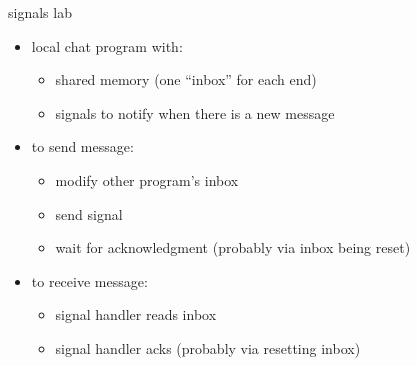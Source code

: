 \begin{frame}{signals lab}
    \begin{itemize}
    \item local chat program with:
        \begin{itemize}
        \item shared memory (one ``inbox'' for each end)
        \item signals to notify when there is a new message
        \end{itemize}
    \item to send message:
        \begin{itemize}
        \item modify other program's inbox
        \item send signal
        \item wait for acknowledgment (probably via inbox being reset)
        \end{itemize}
    \item to receive message:
        \begin{itemize}
        \item signal handler reads inbox
        \item signal handler acks (probably via resetting inbox)
        \end{itemize}
    \end{itemize}
\end{frame}
